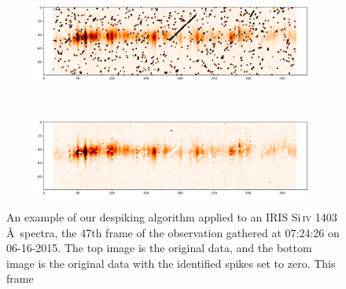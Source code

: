 \documentclass[10pt,letterpaper]{article}
\newcommand{\SiIV}{Si\,\textsc{iv} 1403 \AA}
\begin{document}
				\begin{figure}[h!]
					\centering
					\begin{subfigure}[t]{0.8\textwidth}
						\centering
						\includegraphics[width=\textwidth]{fig/orig}
					\end{subfigure}
					~ 
					\begin{subfigure}[t]{0.8\textwidth}
						\centering
						\includegraphics[width=\textwidth]{fig/dspk}
					\end{subfigure}
					\caption{An example of our despiking algorithm applied to an IRIS \SiIV\ spectra, the 47th frame of the observation gathered at 07:24:26 on 06-16-2015. The top image is the original data, and the bottom image is the original data with the identified spikes set to zero. This frame }
				\end{figure}
				
\end{document}
